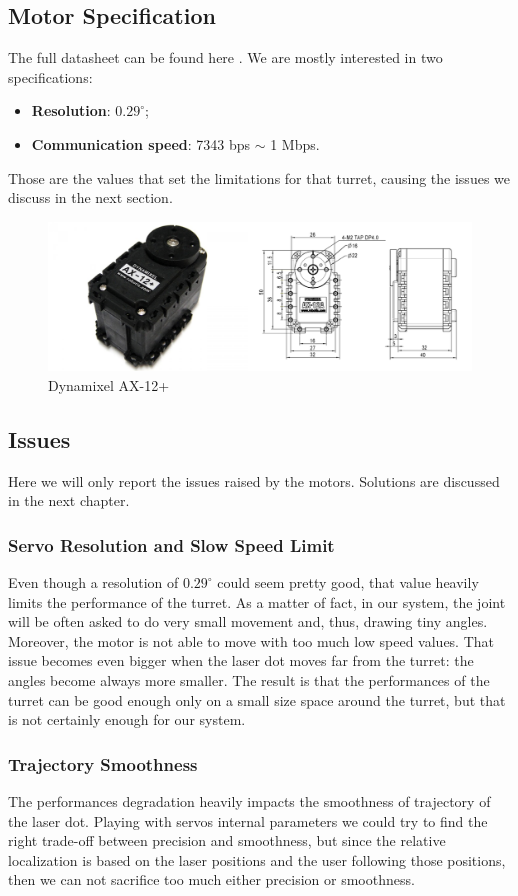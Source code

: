 \subsection{Motor Specification}
The full datasheet can be found here \cite{datasheet-AX-12}. We are mostly interested in two specifications: 
\begin{itemize}
    \item \textbf{Resolution}: $0.29^{\circ}$;
    \item \textbf{Communication speed}: 7343 bps $\sim$ 1 Mbps.
\end{itemize}
Those are the values that set the limitations for that turret, causing the issues we discuss in the next section.
\begin{figure}
	\centering
	\includegraphics[width=\textwidth]{img/ax12+.png}%
	\caption{Dynamixel AX-12+}
	\label{fig:ax12+}
\end{figure}
\subsection{Issues}\label{subs:firstModel:issues}
Here we will only report the issues raised by the motors. Solutions are discussed in the next chapter.
\subsubsection{Servo Resolution and Slow Speed Limit}
Even though a resolution of $0.29^{\circ}$ could seem pretty good, that value heavily limits the performance of the turret. As a matter of fact, in our system, the joint will be often asked to do very small movement and, thus, drawing tiny angles. Moreover, the motor is not able to move with too much low speed values. That issue becomes even bigger when the laser dot moves far from the turret: the angles become always more smaller. The result is that the performances of the turret can be good enough only on a small size space around the turret, but that is not certainly enough for our system.
\subsubsection{Trajectory Smoothness}
The performances degradation heavily impacts the smoothness of trajectory of the laser dot. Playing with servos internal parameters we could try to find the right trade-off between precision and smoothness, but since the relative localization is based on the laser positions and the user following those positions, then we can not sacrifice too much either precision or smoothness.
